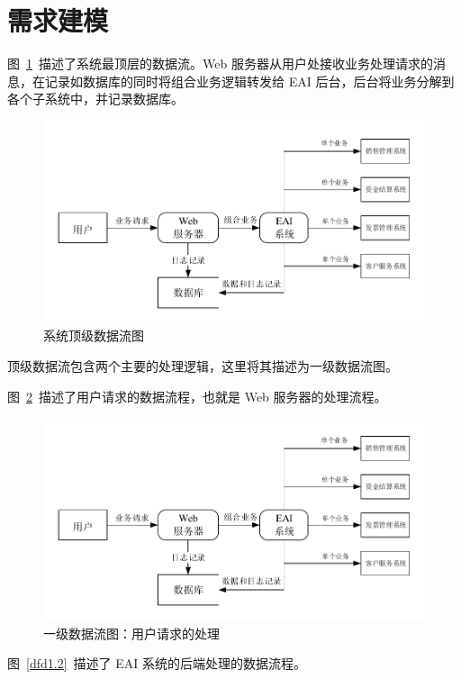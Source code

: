 \documentclass[cs4size,a4paper,nofonts]{ctexart}
\begin{document}
\section{需求建模}

图~\ref{dfd0}~描述了系统最顶层的数据流。Web 服务器从用户处接收业务处理请求的消息，在记录如数据库的同时将组合业务逻辑转发给 EAI 后台，后台将业务分解到各个子系统中，并记录数据库。

\begin{figure}[htp]
\includegraphics[width=\textwidth,page=1]{images/dfd.pdf}
\caption{\label{dfd0}系统顶级数据流图}
\end{figure}

顶级数据流包含两个主要的处理逻辑，这里将其描述为一级数据流图。

图~\ref{dfd1.1}~描述了用户请求的数据流程，也就是 Web 服务器的处理流程。

\begin{figure}[htp]
\includegraphics[width=\textwidth,page=2]{images/dfd.pdf}
\caption{\label{dfd1.1}一级数据流图：用户请求的处理}
\end{figure}

图~\ref{dfd1.2}~描述了 EAI 系统的后端处理的数据流程。
\end{document}
